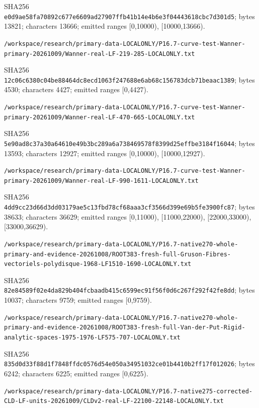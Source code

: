 \documentclass[11pt]{article}
\begin{document}
SHA256 \texttt{e0d9ae58fa70892c677e6609ad27907ffb41b14e4b6e3f04443618cbc7d301d5}; bytes 13821; characters 13666; emitted ranges [0,10000), [10000,13666).

\texttt{/\allowbreak workspace/\allowbreak research/\allowbreak primary-data-LOCALONLY/\allowbreak P16.7-curve-test-Wanner-primary-20261009/\allowbreak Wanner-real-LF-219-285-LOCALONLY.txt}

SHA256 \texttt{12c06c6380c04be88464dc8ecd1063f247688e6ab68c156783dcb71beaac1389}; bytes 4530; characters 4427; emitted ranges [0,4427).

\texttt{/\allowbreak workspace/\allowbreak research/\allowbreak primary-data-LOCALONLY/\allowbreak P16.7-curve-test-Wanner-primary-20261009/\allowbreak Wanner-real-LF-470-665-LOCALONLY.txt}

SHA256 \texttt{5e90ad8c37a30a64610e49b3bc289a6a738469578f8399d25effbe3184f16044}; bytes 13593; characters 12927; emitted ranges [0,10000), [10000,12927).

\texttt{/\allowbreak workspace/\allowbreak research/\allowbreak primary-data-LOCALONLY/\allowbreak P16.7-curve-test-Wanner-primary-20261009/\allowbreak Wanner-real-LF-990-1611-LOCALONLY.txt}

SHA256 \texttt{4dd9cc23d66d3dd03179ae5c13fbd78cf68aaa3cf3566d399e69b5fe3900fc87}; bytes 38633; characters 36629; emitted ranges [0,11000), [11000,22000), [22000,33000), [33000,36629).

\texttt{/\allowbreak workspace/\allowbreak research/\allowbreak primary-data-LOCALONLY/\allowbreak P16.7-native270-whole-primary-and-evidence-20261008/\allowbreak ROOT383-fresh-full-Gruson-Fibres-vectoriels-polydisque-1968-LF1510-1690-LOCALONLY.txt}

SHA256 \texttt{82e84589f02e4da829b404fcbaadb415c6599ec91f56f0d6c267f292f42fe8dd}; bytes 10037; characters 9759; emitted ranges [0,9759).

\texttt{/\allowbreak workspace/\allowbreak research/\allowbreak primary-data-LOCALONLY/\allowbreak P16.7-native270-whole-primary-and-evidence-20261008/\allowbreak ROOT383-fresh-full-Van-der-Put-Rigid-analytic-spaces-1975-1976-LF575-707-LOCALONLY.txt}

SHA256 \texttt{835d0d33f88d1f7848ffdc0576d54e050a34951032ce01b4410b2ff17f012026}; bytes 6242; characters 6225; emitted ranges [0,6225).

\texttt{/\allowbreak workspace/\allowbreak research/\allowbreak primary-data-LOCALONLY/\allowbreak P16.7-native275-corrected-CLD-LF-units-20261009/\allowbreak CLDv2-real-LF-22100-22148-LOCALONLY.txt}
\end{document}
